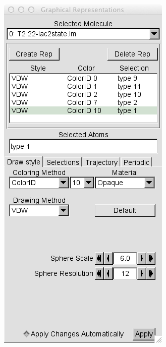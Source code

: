 \begin{figure}[h!]
  \centering
          \begin{subfigure}[b]{0.29\textwidth}
          \includegraphics[width=\textwidth]{Figures/GraphicsRep.png}

\end{subfigure}
\end{figure}
